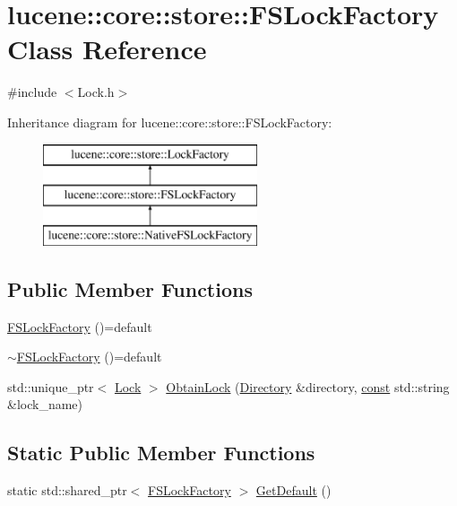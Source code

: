 \hypertarget{classlucene_1_1core_1_1store_1_1FSLockFactory}{}\section{lucene\+:\+:core\+:\+:store\+:\+:F\+S\+Lock\+Factory Class Reference}
\label{classlucene_1_1core_1_1store_1_1FSLockFactory}


{\ttfamily \#include $<$Lock.\+h$>$}

Inheritance diagram for lucene\+:\+:core\+:\+:store\+:\+:F\+S\+Lock\+Factory\+:\begin{figure}[H]
\begin{center}
\leavevmode
\includegraphics[height=3.000000cm]{classlucene_1_1core_1_1store_1_1FSLockFactory}
\end{center}
\end{figure}
\subsection*{Public Member Functions}
\begin{DoxyCompactItemize}
\item 
\mbox{\hyperlink{classlucene_1_1core_1_1store_1_1FSLockFactory_a79b352c1027fdeaac320db25f8f4b210}{F\+S\+Lock\+Factory}} ()=default
\item 
\mbox{\hyperlink{classlucene_1_1core_1_1store_1_1FSLockFactory_a374143fab26447169486f694b26e9abe}{$\sim$\+F\+S\+Lock\+Factory}} ()=default
\item 
std\+::unique\+\_\+ptr$<$ \mbox{\hyperlink{classlucene_1_1core_1_1store_1_1Lock}{Lock}} $>$ \mbox{\hyperlink{classlucene_1_1core_1_1store_1_1FSLockFactory_a27bb42e846edf5f69913b78ccdf3208e}{Obtain\+Lock}} (\mbox{\hyperlink{classlucene_1_1core_1_1store_1_1Directory}{Directory}} \&directory, \mbox{\hyperlink{ZlibCrc32_8h_a2c212835823e3c54a8ab6d95c652660e}{const}} std\+::string \&lock\+\_\+name)
\end{DoxyCompactItemize}
\subsection*{Static Public Member Functions}
\begin{DoxyCompactItemize}
\item 
static std\+::shared\+\_\+ptr$<$ \mbox{\hyperlink{classlucene_1_1core_1_1store_1_1FSLockFactory}{F\+S\+Lock\+Factory}} $>$ \mbox{\hyperlink{classlucene_1_1core_1_1store_1_1FSLockFactory_a03a544c5fb7c43ae2495f6dcc5ea1381}{Get\+Default}} ()
\end{DoxyCompactItemize}
